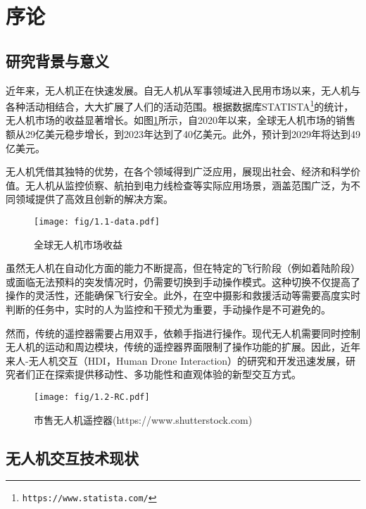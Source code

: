 \ifx\allfiles\undefined


\else
\fi

\section{序论}

\subsection{研究背景与意义}

近年来，无人机正在快速发展。自无人机从军事领域进入民用市场以来，无人机与各种活动相结合，大大扩展了人们的活动范围。根据数据库STATISTA\footnote{\texttt{https://www.statista.com/}}的统计，无人机市场的收益显著增长。如图\ref{fig:Drone revenue}所示，自2020年以来，全球无人机市场的销售额从29亿美元稳步增长，到2023年达到了40亿美元。此外，预计到2029年将达到49亿美元。

无人机凭借其独特的优势，在各个领域得到广泛应用，展现出社会、经济和科学价值。无人机从监控侦察、航拍到电力线检查等实际应用场景，涵盖范围广泛，为不同领域提供了高效且创新的解决方案。
\begin{figure}[htbp]
    \centering
    \texttt{[image: fig/1.1-data.pdf]}
    \caption{全球无人机市场收益}
    \label{fig:Drone revenue}
\end{figure}

虽然无人机在自动化方面的能力不断提高，但在特定的飞行阶段（例如着陆阶段）或面临无法预料的突发情况时，仍需要切换到手动操作模式。这种切换不仅提高了操作的灵活性，还能确保飞行安全。此外，在空中摄影和救援活动等需要高度实时判断的任务中，实时的人为监控和干预尤为重要，手动操作是不可避免的。

然而，传统的遥控器需要占用双手，依赖手指进行操作。现代无人机需要同时控制无人机的运动和周边模块，传统的遥控器界面限制了操作功能的扩展。因此，近年来人-无人机交互（HDI，Human Drone Interaction）的研究和开发迅速发展，研究者们正在探索提供移动性、多功能性和直观体验的新型交互方式。

\begin{figure}[htbp]
    \centering
    \texttt{[image: fig/1.2-RC.pdf]}
    \caption{市售无人机遥控器(https://www.shutterstock.com)}
    \label{fig:2.1-Controller}
\end{figure}

\subsection{无人机交互技术现状}

